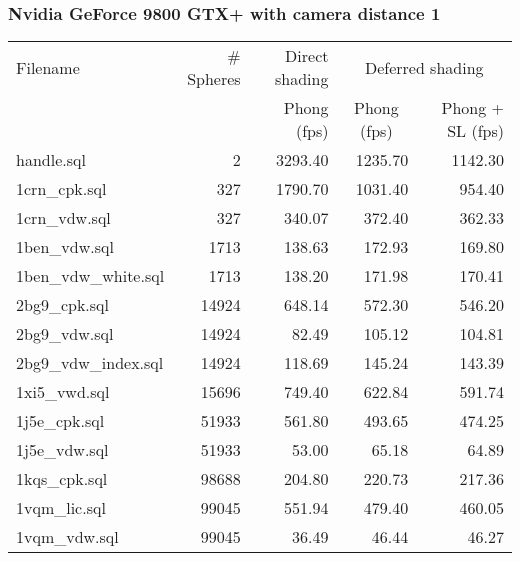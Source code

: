 \subsubsection*{Nvidia GeForce 9800 GTX+ with camera distance 1}
\begin{tabular}{|l|r|r|r|r|}
\hline
Filename & \# Spheres & Direct shading & \multicolumn{2}{|c|}{Deferred shading} \\
         &            & Phong (fps)    & \multicolumn{1}{|c}{Phong (fps)} & Phong + SL (fps) \\  
\hline
\hline
handle.sql & 2 & 3293.40 & 1235.70 & 1142.30 \\
\hline
1crn\_cpk.sql & 327 & 1790.70 & 1031.40 & 954.40 \\
\hline
1crn\_vdw.sql & 327 & 340.07 & 372.40 & 362.33 \\
\hline
1ben\_vdw.sql & 1713 & 138.63 & 172.93 & 169.80 \\
\hline
1ben\_vdw\_white.sql & 1713 & 138.20 & 171.98 & 170.41 \\
\hline
2bg9\_cpk.sql & 14924 & 648.14 & 572.30 & 546.20 \\
\hline
2bg9\_vdw.sql & 14924 & 82.49 & 105.12 & 104.81 \\
\hline
2bg9\_vdw\_index.sql & 14924 & 118.69 & 145.24 & 143.39 \\
\hline
1xi5\_vwd.sql & 15696 & 749.40 & 622.84 & 591.74 \\
\hline
1j5e\_cpk.sql & 51933 & 561.80 & 493.65 & 474.25 \\
\hline
1j5e\_vdw.sql & 51933 & 53.00 & 65.18 & 64.89 \\
\hline
1kqs\_cpk.sql & 98688 & 204.80 & 220.73 & 217.36 \\
\hline
1vqm\_lic.sql & 99045 & 551.94 & 479.40 & 460.05 \\
\hline
1vqm\_vdw.sql & 99045 & 36.49 & 46.44 & 46.27 \\
\hline
\end{tabular}
